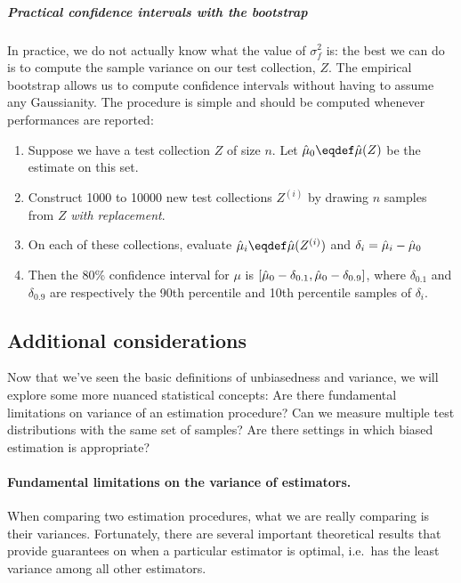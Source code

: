 \subparagraph{Practical confidence intervals with the bootstrap}
In practice, we do not actually know what the value of $\sigma^2_f$ is: the best we can do is to compute the sample variance on our test collection, $Z$.
The empirical bootstrap allows us to compute confidence intervals without having to assume any Gaussianity.
The procedure is simple and should be computed whenever performances are reported:
\begin{enumerate}
  \item Suppose we have a test collection $Z$ of size $n$. Let $\muh_0 \eqdef \muh(Z)$ be the estimate on this set.
  \item Construct 1000 to 10000 new test collections $Z^{(i)}$ by drawing $n$ samples from $Z$ \textit{with replacement}.
  \item On each of these collections, evaluate $\muh_{i} \eqdef \muh(Z^{(i)})$ and $\delta_i = \hat{\mu}_i - \hat{\mu}_0$
  \item Then the 80\% confidence interval for $\mu$ is $[\hat{\mu}_0 - \delta_{0.1}, \hat{\mu}_0 - \delta_{0.9}]$, where $\delta_{0.1}$ and $\delta_{0.9}$ are respectively the 90th percentile and 10th percentile samples of $\delta_i$. 
\end{enumerate}

\subsection{Additional considerations}
Now that we've seen the basic definitions of unbiasedness and variance, we will explore some more nuanced statistical concepts:
  Are there fundamental limitations on variance of an estimation procedure?
  Can we measure multiple test distributions with the same set of samples?
  Are there settings in which biased estimation is appropriate? 

\paragraph{Fundamental limitations on the variance of estimators.}
When comparing two estimation procedures, what we are really comparing is their variances.
Fortunately, there are several important theoretical results that provide guarantees on when a particular estimator is optimal, i.e.\ has the least variance among all other estimators.

